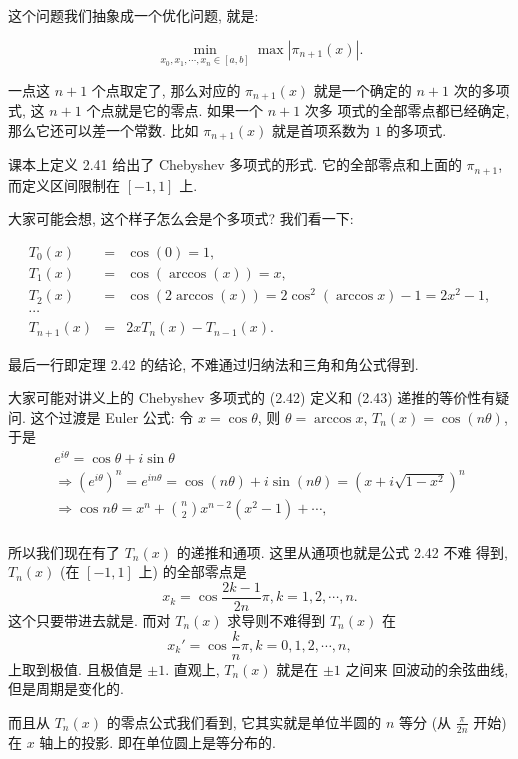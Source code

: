 \documentclass[a4paper]{ctexart}
\newcommand{\remark}[1]
{\noindent {\bf Remark {#1}}}
\begin{document}
这个问题我们抽象成一个优化问题, 就是:

$$
\min_{x_0, x_1, \cdots, x_n \in [a, b]} \max|\pi_{n + 1}(x)|.
$$

一点这 $n + 1$ 个点取定了, 那么对应的 $\pi_{n + 1}(x)$ 就是一个确定的
$n + 1$ 次的多项式, 这 $n + 1$ 个点就是它的零点. 如果一个 $n + 1$ 次多
项式的全部零点都已经确定, 那么它还可以差一个常数. 比如 $\pi_{n +
  1}(x)$ 就是首项系数为 $1$ 的多项式. 

课本上定义 2.41 给出了 Chebyshev 多项式的形式. 它的全部零点和上面的
$\pi_{n + 1}$, 而定义区间限制在 $[-1, 1]$ 上.

大家可能会想, 这个样子怎么会是个多项式? 我们看一下:

$$
\begin{array}{rcl}
  T_0(x) &=& \cos(0) = 1, \\
  T_1(x) &=& \cos(\arccos(x)) = x, \\
  T_2(x) &=& \cos(2 \arccos(x)) = 2 \cos^2 (\arccos x) - 1 = 2 x^2 - 1, \\
  \cdots && \\
  T_{n + 1}(x) &=& 2 x T_n(x) - T_{n - 1}(x).
\end{array}
$$

最后一行即定理 2.42 的结论, 不难通过归纳法和三角和角公式得到.

\remark{2.33} 大家可能对讲义上的 Chebyshev 多项式的 (2.42) 定义和 (2.43) 
递推的等价性有疑问. 这个过渡是 Euler 公式: 令 $x = \cos \theta$, 则
$\theta = \arccos x$, $T_n(x) = \cos(n\theta)$, 于是
$$
\begin{array}{r}
  e^{i\theta} = \cos \theta + i \sin \theta \\
\Rightarrow \left(e^{i \theta}\right)^n = e^{in\theta} = \cos(n\theta) + i\sin(n\theta)
= \left(x + i \sqrt{1 - x^2}\right)^n \\
\Rightarrow \cos n\theta = x^n + {n \choose 2} x^{n - 2}(x^2 - 1) + \cdots, \\
\end{array}
$$

所以我们现在有了 $T_n(x)$ 的递推和通项. 这里从通项也就是公式 2.42 不难
得到, $T_n(x)$ (在 $[-1, 1]$ 上) 的全部零点是
$$
x_k = \cos \frac{2 k - 1}{2n} \pi, k = 1, 2, \cdots, n.
$$
这个只要带进去就是. 而对 $T_n(x)$ 求导则不难得到 $T_n(x)$ 在
$$
x_k' = \cos \frac{k}{n} \pi, k = 0, 1, 2, \cdots, n,
$$
上取到极值. 且极值是 $\pm 1$. 直观上, $T_n(x)$ 就是在 $\pm 1$ 之间来
回波动的余弦曲线, 但是周期是变化的.

而且从 $T_n(x)$ 的零点公式我们看到, 它其实就是单位半圆的 $n$ 等分 (从 $\frac{\pi}{2n}$ 开始) 
在 $x$ 轴上的投影. 即在单位圆上是等分布的. 
\end{document}
